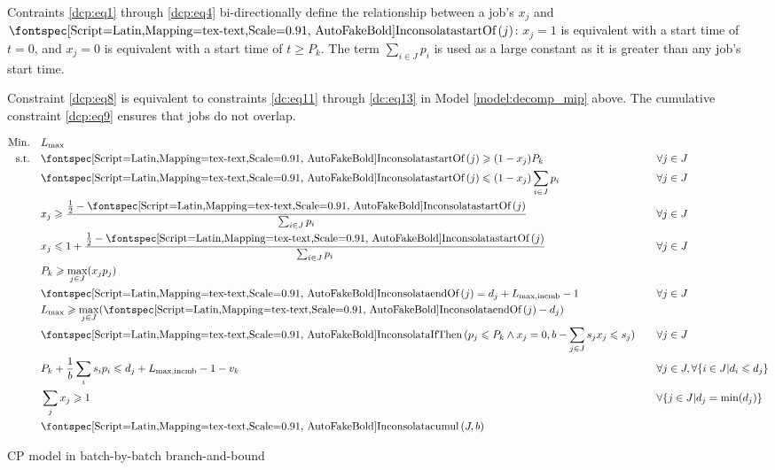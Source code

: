 Contraints \eqref{dcp:eq1} through \eqref{dcp:eq4} bi-directionally define the
relationship between a job's $x_j$ and $\startOf(j)$: $x_j = 1$ is equivalent
with a start time of $t = 0$, and $x_j = 0$ is equivalent with a start time of
$t \geq P_k$. The term $\sum_{i \in J} p_i$ is used as a large constant as it is
greater than any job's start time.

Constraint \eqref{dcp:eq8} is equivalent to constraints \eqref{dc:eq11} through
\eqref{dc:eq13} in Model \ref{model:decomp_mip} above. The cumulative constraint
\eqref{dcp:eq9} ensures that jobs do not overlap. 

\begin{model}[h]
\begin{alignat}{2}
\mathrm{Min.} \quad & \Lmax \quad && \\
\mathrm{s.t.} \quad 
& \label{dcp:eq1} \startOf(j) \geq (1-x_j) P_k \quad && \forall j \in J \\
& \startOf(j) \leq (1-x_j) \sum_{i \in J} p_i \quad && \forall j \in J \\
& x_j \geq \frac{ \frac{1}{2} - \startOf(j) }{ \sum_{i \in J} p_i } \quad &&
\forall j \in J \\
& \label{dcp:eq4} x_j \leq 1+\frac{ \frac{1}{2} - \startOf(j)}{\sum_{i \in J} p_i } \quad &&
\forall j \in J \\
& P_k \geq \underset{j \in J}{\max}(x_j p_j) \quad && \\
& \endOf(j) = d_j + L_{\text{max,incmb}} - 1 \quad && \forall j \in J \\
& \Lmax \geq \underset{j \in J}{\max}(\endOf(j) - d_j) \quad &&  \\
& \label{dcp:eq8} \mathtt{IfThen}(p_j \leq P_k \land x_j = 0, b - \sum_{j \in J} s_j
x_j \leq s_j) \quad && \forall j \in J \\
& P_k + \frac{1}{b} \sum_i s_i p_i \leq d_j + L_{\text{max,incmb}} - 1 - v_k
\quad && \forall j \in J, \forall \{i \in J | d_i \leq d_j\} \\
& \sum_j x_j \geq 1 \quad && \forall \{ j \in J | d_j = \min(d_j) \} \\
& \label{dcp:eq9} \mathtt{cumul}(J, b) \quad & &  
\end{alignat}
\caption{CP model in batch-by-batch branch-and-bound}
\label{model:decomp_cp}
\end{model}



